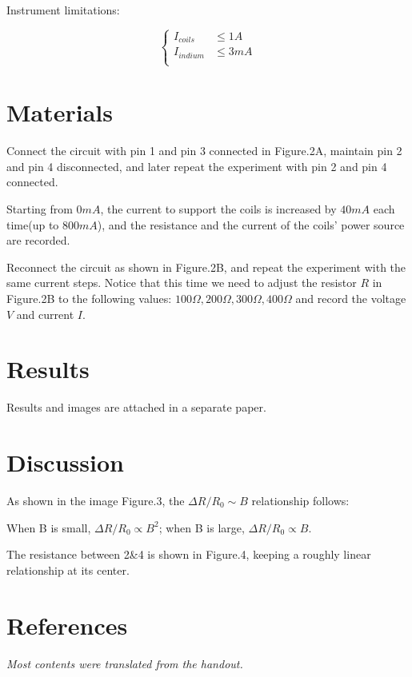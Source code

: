 \documentclass[a4paper]{article}
\begin{document}
\begin{multicols*}{2}
  Instrument limitations:

  \begin{equation}
    \left\{
    \begin{aligned}
      I_{coils}  & \leq 1 A  \\
      I_{indium} & \leq 3 mA \\
    \end{aligned}
    \right.
  \end{equation}

  \section*{Materials}
  Connect the circuit with pin 1 and pin 3 connected in Figure.2A, maintain pin 2 and pin 4 disconnected, and later repeat the experiment with pin 2 and pin 4 connected.
  \par
  Starting from $0 mA$, the current to support the coils is increased by $40mA$ each time(up to $800mA$), and the resistance and the current of the coils' power source are recorded.

  Reconnect the circuit as shown in Figure.2B, and repeat the experiment with the same current steps. Notice that this time we need to adjust the resistor $R$ in Figure.2B to the following values: $100\Omega, 200\Omega, 300\Omega,400\Omega$ and record the voltage $V$ and current $I$.

  \section*{Results}
  Results and images are attached in a separate paper.
  \section*{Discussion}
  As shown in the image Figure.3, the $\Delta R/R_0 \sim B$ relationship follows:
  \par
  When B is small, $\Delta R/R_0 \propto B^2$;
  when B is large, $\Delta R/R_0 \propto B$.

  The resistance between 2\&4 is shown in Figure.4, keeping a roughly linear relationship at its center.
  \section*{References}
  \textit{Most contents were translated from the handout.}
  \newpage
\end{multicols*}
\end{document}
